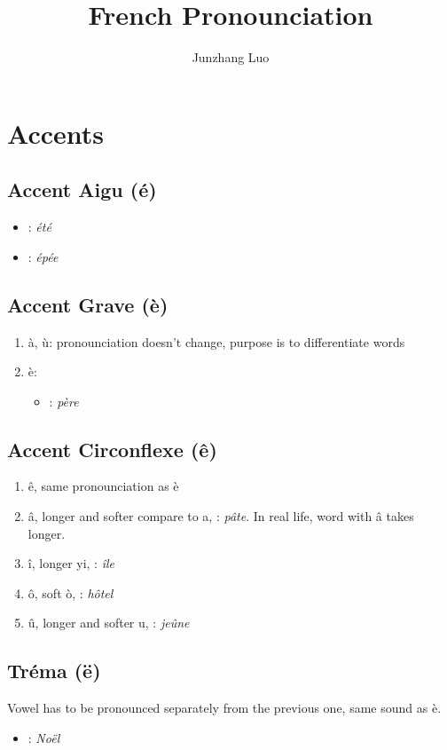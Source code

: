 \documentclass{book}
\title{French Pronounciation}
\author{Junzhang Luo}
\begin{document}
\tableofcontents

\chapter{Accents}

    \section{Accent Aigu (é)}
        \begin{itemize}
            \item \textipa{[e]}: \textit{été}
            \item \textipa{[je]}: \textit{épée}
        \end{itemize}

    \section{Accent Grave (è)}
        \begin{enumerate}
            \item à, ù: pronounciation doesn't change, purpose is to differentiate words
            \item è: 
                \begin{itemize}
                    \item \textipa{[E]}: \textit{père}
                \end{itemize}
        \end{enumerate}
    
    \section{Accent Circonflexe (ê)}
        \begin{enumerate}
            \item ê, same pronounciation as è
            \item â, longer and softer compare to a, \textipa{[a]}: \textit{pâte}. In real life, word with â takes longer.
            \item î, longer yi, \textipa{[i]}: \textit{île}
            \item ô, soft ò, \textipa{[o]}: \textit{hôtel}
            \item û, longer and softer u, \textipa{[y]}: \textit{jeûne}
        \end{enumerate}
    
    \section{Tréma (ë)}
        Vowel has to be pronounced separately from the previous one, same sound as è.
        \begin{itemize}
            \item \textipa{[E]}: \textit{Noël}
        \end{itemize}
    
\end{document}
